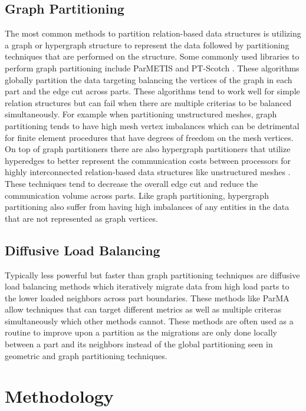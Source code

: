 \documentclass[a4paper]{article}
\begin{document}
\subsection{Graph Partitioning}
The most common methods to partition relation-based data structures is utilizing a graph or hypergraph structure to represent the data followed by partitioning techniques that are performed on the structure. Some commonly used libraries to perform graph partitioning include ParMETIS \cite{parmetis4} and PT-Scotch \cite{scotch2009}. These algorithms globally partition the data targeting balancing the vertices of the graph in each part and the edge cut across parts. These algorithms tend to work well for simple relation structures but can fail when there are multiple criterias to be balanced simultaneously. For example when partitioning unstructured meshes, graph partitioning tends to have high mesh vertex imbalances which can be detrimental for finite element procedures that have degrees of freedom on the mesh vertices. \\
On top of graph partitioners there are also hypergraph partitioners that utilize hyperedges to better represent the communication costs between processors for highly interconnected relation-based data structures like unstructured meshes \cite{devine2002zoltan}. These techniques tend to decrease the overall edge cut and reduce the communication volume across parts. Like graph partitioning, hypergraph partitioning also suffer from having high imbalances of any entities in the data that are not represented as graph vertices. 

\subsection{Diffusive Load Balancing}
Typically less powerful but faster than graph partitioning techniques are diffusive load balancing methods which iteratively migrate data from high load parts to the lower loaded neighbors across part boundaries. These methods like ParMA \cite{SmithParma2015} allow techniques that can target different metrics as well as multiple criteras simultaneously which other methods cannot. These methods are often used as a routine to improve upon a partition as the migrations are only done locally between a part and its neighbors instead of the global partitioning seen in geometric and graph partitioning techniques.

\section{Methodology}
\end{document}
